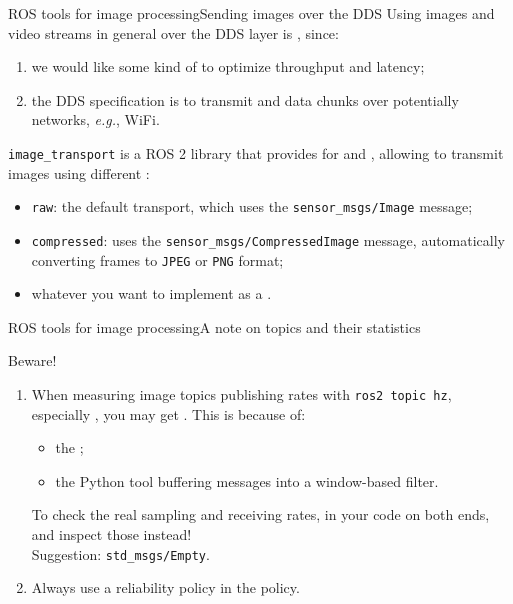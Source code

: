 \begin{frame}{ROS tools for image processing}{Sending images over the DDS}
	Using images and video streams in general over the DDS layer is , since:
	\begin{enumerate}
		\item we would like some kind of  to optimize throughput and latency;
		\item the DDS specification is  to transmit  and  data chunks over potentially  networks, \emph{e.g.}, WiFi.
	\end{enumerate}
	\texttt{image\_transport} is a ROS 2 library that provides  for  and , allowing to transmit images using different :
	\begin{itemize}
		\item \texttt{raw}: the default transport, which uses the \texttt{sensor\_msgs/Image} message;
		\item \texttt{compressed}: uses the \texttt{sensor\_msgs/CompressedImage} message, automatically converting frames to \texttt{JPEG} or \texttt{PNG} format;
		\item whatever you want to implement as a .
	\end{itemize}
\end{frame}
\begin{frame}{ROS tools for image processing}{A note on topics and their statistics}
	\begin{alertblock}{Beware!}
		\begin{enumerate}
			\item When measuring image topics publishing rates with \texttt{ros2 topic hz}, especially , you may get . This is because of:
			      \begin{itemize}
				      \item the ;
				      \item the  Python tool buffering messages into a window-based filter.
			      \end{itemize}
			      To check the real sampling and receiving rates,  in your code on both ends, and inspect those instead!\\
			      Suggestion: \texttt{std\_msgs/Empty}.
      \item Always use a  reliability policy in the  policy.
		\end{enumerate}
	\end{alertblock}
\end{frame}
